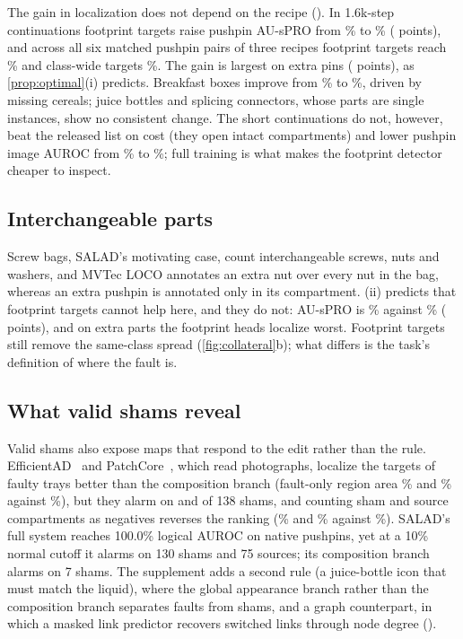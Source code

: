 The gain in localization does not depend on the recipe (). In 1.6k-step continuations footprint targets raise pushpin AU-sPRO from \ppCW\% to \ppFP\% (\ppGain{} points), and across all six matched pushpin pairs of three recipes footprint targets reach \sixFP\% and class-wide targets \sixCW\%. The gain is largest on extra pins (\ppAddGain{} points), as \cref{prop:optimal}(i) predicts. Breakfast boxes improve from \bbCW\% to \bbFP\%, driven by missing cereals; juice bottles and splicing connectors, whose parts are single instances, show no consistent change. The short continuations do not, however, beat the released list on cost (they open \opFPW{} intact compartments) and lower pushpin image AUROC from \aucRel\% to \aucFP\%; full training is what makes the footprint detector cheaper to inspect.

\subsection{Interchangeable parts}
\label{sec:ambiguous}
Screw bags, SALAD's motivating case, count interchangeable screws, nuts and washers, and MVTec LOCO annotates an extra nut over every nut in the bag, whereas an extra pushpin is annotated only in its compartment. (ii) predicts that footprint targets cannot help here, and they do not: AU-sPRO is \sbFP\% against \sbCW\% (\sbGain{} points), and on extra parts the footprint heads localize worst. Footprint targets still remove the same-class spread (\cref{fig:collateral}b); what differs is the task's definition of where the fault is.

\subsection{What valid shams reveal}
\label{sec:shams}
Valid shams also expose maps that respond to the edit rather than the rule. EfficientAD~\cite{batzner2024} and PatchCore~\cite{roth2022}, which read photographs, localize the targets of faulty trays better than the composition branch (fault-only region area \eadRegFault\% and \pcRegFault\% against \relRegFault\%), but they alarm on \eadSham{} and \pcSham{} of 138 shams, and counting sham and source compartments as negatives reverses the ranking (\eadRegAll\% and \pcRegAll\% against \relRegAll\%). SALAD's full system reaches 100.0\% logical AUROC on native pushpins, yet at a 10\% normal cutoff it alarms on 130 shams and 75 sources; its composition branch alarms on 7 shams. The supplement adds a second rule (a juice-bottle icon that must match the liquid), where the global appearance branch rather than the composition branch separates faults from shams, and a graph counterpart, in which a masked link predictor recovers switched links through node degree ().
